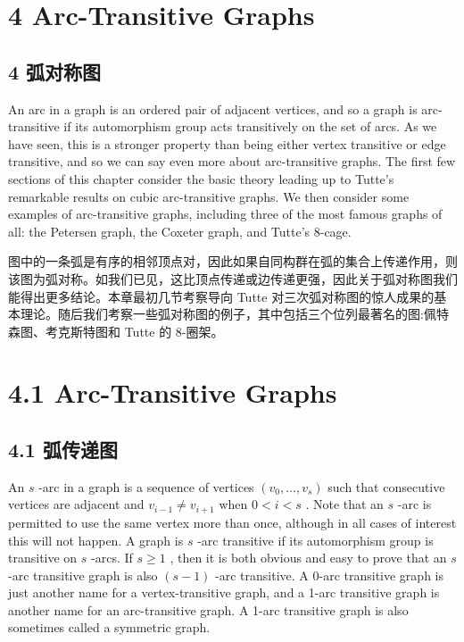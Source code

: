 \documentclass[10pt]{article}
\begin{document}
\section*{4 Arc-Transitive Graphs}

\begin{tcolorbox}\relax
\section*{4 弧对称图}
\end{tcolorbox}

An arc in a graph is an ordered pair of adjacent vertices, and so a graph is arc-transitive if its automorphism group acts transitively on the set of arcs. As we have seen, this is a stronger property than being either vertex transitive or edge transitive, and so we can say even more about arc-transitive graphs. The first few sections of this chapter consider the basic theory leading up to Tutte's remarkable results on cubic arc-transitive graphs. We then consider some examples of arc-transitive graphs, including three of the most famous graphs of all: the Petersen graph, the Coxeter graph, and Tutte's 8-cage.

\begin{tcolorbox}\relax
图中的一条弧是有序的相邻顶点对，因此如果自同构群在弧的集合上传递作用，则该图为弧对称。如我们已见，这比顶点传递或边传递更强，因此关于弧对称图我们能得出更多结论。本章最初几节考察导向 Tutte 对三次弧对称图的惊人成果的基本理论。随后我们考察一些弧对称图的例子，其中包括三个位列最著名的图:佩特森图、考克斯特图和 Tutte 的 8-圈架。
\end{tcolorbox}

\section*{4.1 Arc-Transitive Graphs}

\begin{tcolorbox}\relax
\section*{4.1 弧传递图}
\end{tcolorbox}

An \(s\) -arc in a graph is a sequence of vertices \(\left( {{v}_{0},\ldots ,{v}_{s}}\right)\) such that consecutive vertices are adjacent and \({v}_{i - 1} \neq  {v}_{i + 1}\) when \(0 < i < s\) . Note that an \(s\) -arc is permitted to use the same vertex more than once, although in all cases of interest this will not happen. A graph is \(s\) -arc transitive if its automorphism group is transitive on \(s\) -arcs. If \(s \geq  1\) , then it is both obvious and easy to prove that an \(s\) -arc transitive graph is also \(\left( {s - 1}\right)\) -arc transitive. A 0-arc transitive graph is just another name for a vertex-transitive graph, and a 1-arc transitive graph is another name for an arc-transitive graph. A 1-arc transitive graph is also sometimes called a symmetric graph.
\end{document}
